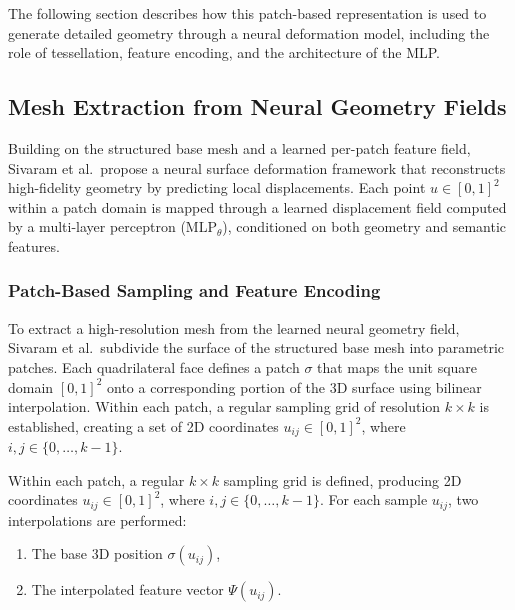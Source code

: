 The following section describes how this patch-based representation is used to generate detailed geometry through a neural deformation model, including the role of tessellation, feature encoding, and the architecture of the MLP.  





\subsection{Mesh Extraction from Neural Geometry Fields}

Building on the structured base mesh and a learned per-patch feature field, Sivaram et al.\ propose a neural surface deformation framework that reconstructs high-fidelity geometry by predicting local displacements.  
Each point $u \in [0,1]^2$ within a patch domain is mapped through a learned displacement field computed by a multi-layer perceptron ($\text{MLP}_\theta$), conditioned on both geometry and semantic features.  





\subsubsection{Patch-Based Sampling and Feature Encoding}

To extract a high-resolution mesh from the learned neural geometry field, Sivaram et al.\ subdivide the surface of the structured base mesh into parametric patches.  
Each quadrilateral face defines a patch $\sigma$ that maps the unit square domain $[0,1]^2$ onto a corresponding portion of the 3D surface using bilinear interpolation.  
Within each patch, a regular sampling grid of resolution $k \times k$ is established, creating a set of 2D coordinates $u_{ij} \in [0,1]^2$, where $i,j \in \{0, \ldots, k-1\}$.  

Within each patch, a regular $k \times k$ sampling grid is defined, producing 2D coordinates $u_{ij} \in [0,1]^2$, where $i,j \in \{0,\ldots,k-1\}$.  
For each sample $u_{ij}$, two interpolations are performed:  
\begin{enumerate}
    \item The base 3D position $\sigma(u_{ij})$,  
    \item The interpolated feature vector $\Psi(u_{ij})$.
\end{enumerate}


